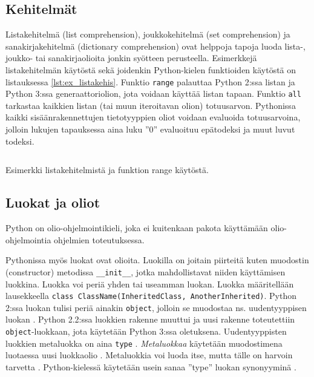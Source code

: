 \documentclass[finnish]{tktltiki2}
\theoremstyle{definition}
\theoremstyle{remark}
\begin{document}
\subsection{Kehitelmät}

Listakehitelmä (list comprehension), joukkokehitelmä (set comprehension) ja sanakirjakehitelmä (dictionary comprehension) ovat helppoja tapoja luoda lista-, joukko- tai sanakirjaolioita jonkin syötteen perusteella. Esimerkkejä listakehitelmän käytöstä sekä joidenkin Python-kielen funktioiden käytöstä on listauksessa \ref{lst:ex_listakehis}. Funktio \verb|range| palauttaa Python 2:ssa listan ja Python 3:ssa generaattoriolion, jota voidaan käyttää listan tapaan. Funktio \verb|all| tarkastaa kaikkien listan (tai muun iteroitavan olion) totuusarvon. Pythonissa kaikki sisäänrakennettujen tietotyyppien oliot voidaan evaluoida totuusarvoina, jolloin lukujen tapauksessa aina luku ''0'' evaluoituu epätodeksi ja muut luvut todeksi.

\begin{listing}
    \inputminted[linenos]{python}{code/luvut.py}
    \caption{Esimerkki listakehitelmistä ja funktion range käytöstä.}
    \label{lst:ex_listakehis}
\end{listing}


\subsection{Luokat ja oliot}

Python on olio-ohjelmointikieli, joka ei kuitenkaan pakota käyttämään olio-ohjelmointia ohjelmien toteutuksessa. 

Pythonissa myös luokat ovat olioita. Luokilla on joitain piirteitä kuten muodostin (constructor) metodissa \verb|__init__|, jotka mahdollistavat niiden käyttämisen luokkina. Luokka voi periä yhden tai useamman luokan. Luokka määritellään lausekkeella \lstinline|class ClassName(InheritedClass, AnotherInherited)|. Python 2:ssa luokan tulisi periä ainakin \verb|object|, jolloin se muodostaa ns. uudentyyppisen luokan \cite{martelli2006python}. Python 2.2:ssa luokkien rakenne muuttui ja uusi rakenne toteutettiin \verb|object|-luokkaan, jota käytetään Python 3:ssa oletuksena. Uudentyyppisten luokkien metaluokka on aina \verb|type| \cite{martelli2006python}. \emph{Metaluokkaa} käytetään muodostimena luotaessa uusi luokkaolio \cite{MetaprogP3}. Metaluokkia voi luoda itse, mutta tälle on harvoin tarvetta \cite{MetaprogP3}. Python-kielessä käytetään usein sanaa ''type'' luokan synonyyminä \cite{MetaprogP3}.
\end{document}
